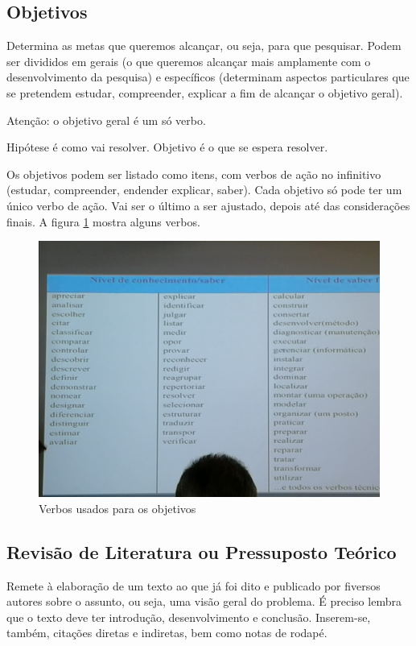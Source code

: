     \subsection{Objetivos} 
        Determina as metas que queremos alcançar, ou seja, para que pesquisar. Podem ser divididos em gerais (o que queremos alcançar mais amplamente com o desenvolvimento da pesquisa) e específicos (determinam aspectos particulares que se pretendem estudar, compreender, explicar a fim de alcançar o objetivo geral).

        Atenção: o objetivo geral é um só verbo.

        Hipótese é como vai resolver. Objetivo é o que se espera resolver.

        Os objetivos podem ser listado como itens, com verbos de ação no infinitivo (estudar, compreender, endender explicar, saber). Cada objetivo só pode ter um único verbo de ação. Vai ser o último a ser ajustado, depois até das considerações finais. A figura \ref{verbos-objetivos} mostra alguns verbos.

    \begin{figure}[h]
        \centering
        \includegraphics[width=1\textwidth]{figuras/verbos-objetivos}
        \caption[Figura]{Verbos usados para os objetivos}
        \label{verbos-objetivos}
    \end{figure}

    \subsection{Revisão de Literatura ou Pressuposto Teórico}
        Remete à elaboração de um texto ao que já foi dito e publicado por fiversos autores sobre o assunto, ou seja, uma visão geral do problema. É preciso lembra que o texto deve ter introdução, desenvolvimento e conclusão. Inserem-se, também, citações diretas e indiretas, bem como notas de rodapé.

